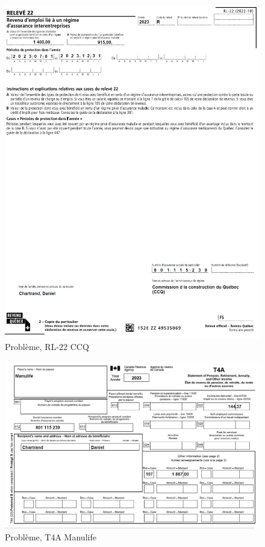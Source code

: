 \begin{figure}
	\centering
	\includegraphics[width=.9\textwidth]{probleme/chapitre-2/RL22-CCQ.png}
	\caption{Problème, RL-22 CCQ}
	\label{fig:Chap2RL22CCQ}
\end{figure}

\begin{figure}
	\centering
	\includegraphics[width=.9\textwidth]{probleme/chapitre-2/T4A-Manulife.png}
	\caption{Problème, T4A Manulife}
	\label{fig:Chap2T4AManulife}
\end{figure}

